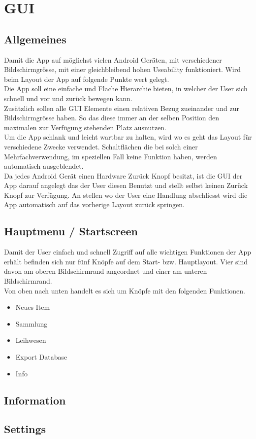 \section{GUI}

\subsection{Allgemeines}

Damit die App auf möglichst vielen Android Geräten, mit verschiedener Bildschirmgrösse, mit einer gleichbleibend hohen Useability funktioniert. Wird beim Layout der App auf folgende Punkte wert gelegt.\\

Die App soll eine einfache und Flache Hierarchie bieten, in welcher der User sich schnell und vor und zurück bewegen kann.\\
Zusätzlich sollen alle GUI Elemente einen relativen Bezug zueinander und zur Bildschirmgrösse haben. So das diese immer an der selben Position den maximalen zur Verfügung stehenden Platz ausnutzen.\\
Um die App schlank und leicht wartbar zu halten, wird wo es geht das Layout für verschiedene Zwecke verwendet. Schaltflächen die bei solch einer Mehrfachverwendung, im speziellen Fall keine Funktion haben, werden automatisch ausgeblendet.\\
Da jedes Android Gerät einen Hardware Zurück Knopf besitzt, ist die GUI der App darauf angelegt das der User diesen Benutzt und stellt selbst keinen Zurück Knopf zur Verfügung. An stellen wo der User eine Handlung abschliesst wird die App automatisch auf das vorherige Layout zurück springen.

\subsection{Hauptmenu / Startscreen}

Damit der User einfach und schnell Zugriff auf alle wichtigen Funktionen der App erhält befinden sich nur fünf Knöpfe auf dem Start- bzw. Hauptlayout. Vier sind davon am oberen Bildschirmrand angeordnet und einer am unteren Bildschirmrand.\\

Von oben nach unten handelt es sich um Knöpfe mit den folgenden Funktionen.

\begin{itemize}
	\item Neues Item
	\item Sammlung
	\item Leihwesen
	\item Export Database
	\item Info
\end{itemize} 

\subsection{Information}

\subsection{Settings}